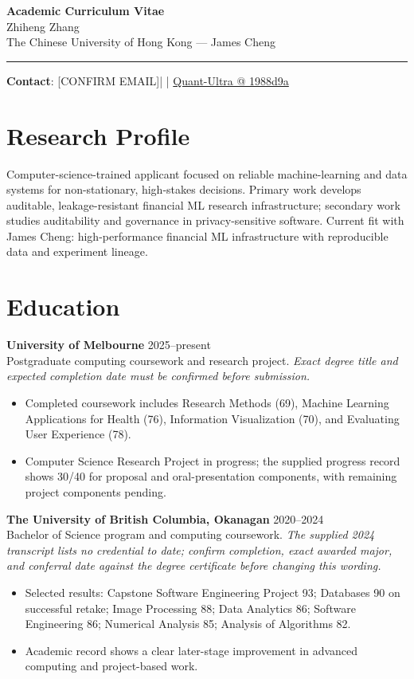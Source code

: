 \documentclass[11pt]{article}
\makeatletter
\newcommand{\ApplicantName}{Zhiheng Zhang}
\newcommand{\ApplicantEmail}{[CONFIRM EMAIL]}
\newcommand{\ApplicantPhone}{[CONFIRM PHONE]}
\newcommand{\ApplicantGitHub}{\href{https://github.com/zhiheng-zhang-Mera/Quant-Ultra/tree/1988d9a8530da91a8158de864d098ea869098923}{Quant-Ultra @ 1988d9a}}
\makeatother
\begin{document}
\begin{center}
{\LARGE\bfseries Academic Curriculum Vitae}\\[0.25em]
{\large \ApplicantName}\\
The Chinese University of Hong Kong --- James Cheng
\end{center}
\vspace{0.35em}\hrule\vspace{0.65em}

\textbf{Contact}: \ApplicantEmail\quad | \quad \ApplicantPhone\quad | \quad \ApplicantGitHub

\section*{Research Profile}
Computer-science-trained applicant focused on reliable machine-learning and data systems for non-stationary, high-stakes decisions. Primary work develops auditable, leakage-resistant financial ML research infrastructure; secondary work studies auditability and governance in privacy-sensitive software. Current fit with James Cheng: high-performance financial ML infrastructure with reproducible data and experiment lineage.

\section*{Education}
\textbf{University of Melbourne} \hfill 2025--present\\
Postgraduate computing coursework and research project. \textit{Exact degree title and expected completion date must be confirmed before submission.}
\begin{itemize}
\item Completed coursework includes Research Methods (69), Machine Learning Applications for Health (76), Information Visualization (70), and Evaluating User Experience (78).
\item Computer Science Research Project in progress; the supplied progress record shows 30/40 for proposal and oral-presentation components, with remaining project components pending.
\end{itemize}

\textbf{The University of British Columbia, Okanagan} \hfill 2020--2024\\
Bachelor of Science program and computing coursework. \textit{The supplied 2024 transcript lists no credential to date; confirm completion, exact awarded major, and conferral date against the degree certificate before changing this wording.}
\begin{itemize}
\item Selected results: Capstone Software Engineering Project 93; Databases 90 on successful retake; Image Processing 88; Data Analytics 86; Software Engineering 86; Numerical Analysis 85; Analysis of Algorithms 82.
\item Academic record shows a clear later-stage improvement in advanced computing and project-based work.
\end{itemize}
\end{document}
